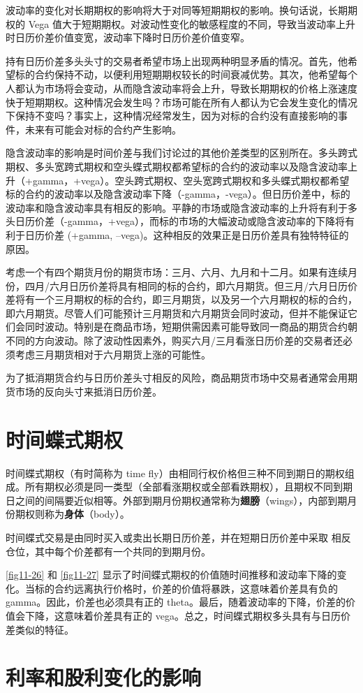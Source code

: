 波动率的变化对长期期权的影响将大于对同等短期期权的影响。换句话说，长期期权的 Vega 值大于短期期权。对波动性变化的敏感程度的不同，导致当波动率上升时日历价差价值变宽，波动率下降时日历价差价值变窄。

持有日历价差多头头寸的交易者希望市场上出现两种明显矛盾的情况。首先，他希望标的合约保持不动，以便利用短期期权较长的时间衰减优势。其次，他希望每个人都认为市场将会变动，从而隐含波动率将会上升，导致长期期权的价格上涨速度快于短期期权。这种情况会发生吗？市场可能在所有人都认为它会发生变化的情况下保持不变吗？事实上，这种情况经常发生，因为对标的合约没有直接影响的事件，未来有可能会对标的合约产生影响。

隐含波动率的影响是时间价差与我们讨论过的其他价差类型的区别所在。多头跨式期权、多头宽跨式期权和空头蝶式期权都希望标的合约的波动率以及隐含波动率上升（+gamma，+vega）。空头跨式期权、空头宽跨式期权和多头蝶式期权都希望标的合约的波动率以及隐含波动率下降（-gamma，-vega）。但日历价差中，标的波动率和隐含波动率具有相反的影响。平静的市场或隐含波动率的上升将有利于多头日历价差（-gamma，+vega），而标的市场的大幅波动或隐含波动率的下降将有利于日历价差 (+gamma, –vega)。这种相反的效果正是日历价差具有独特特征的原因。


考虑一个有四个期货月份的期货市场：三月、六月、九月和十二月。如果有连续月份，四月/六月日历价差将具有相同的标的合约，即六月期货。但三月/六月日历价差将有一个三月期权的标的合约，即三月期货，以及另一个六月期权的标的合约，即六月期货。尽管人们可能预计三月期货和六月期货会同时波动，但并不能保证它们会同时波动。特别是在商品市场，短期供需因素可能导致同一商品的期货合约朝不同的方向波动。除了波动性因素外，购买六月/三月看涨日历价差的交易者还必须考虑三月期货相对于六月期货上涨的可能性。

为了抵消期货合约与日历价差头寸相反的风险，商品期货市场中交易者通常会用期货市场的反向头寸来抵消日历价差。
\section{时间蝶式期权}
时间蝶式期权（有时简称为 time fly）由相同行权价格但三种不同到期日的期权组成。所有期权必须是同一类型（全部看涨期权或全部看跌期权），且期权不同到期日之间的间隔要近似相等。外部到期月份期权通常称为\textbf{翅膀}（wings），内部到期月份期权则称为\textbf{身体}（body）。

时间蝶式交易是由同时买入或卖出长期日历价差，并在短期日历价差中采取
相反仓位，其中每个价差都有一个共同的到期月份。


\autoref{fig11-26} 和 \autoref{fig11-27} 显示了时间蝶式期权的价值随时间推移和波动率下降的变化。当标的合约远离执行价格时，价差的价值将暴跌，这意味着价差具有负的 gamma。因此，价差也必须具有正的 theta。最后，随着波动率的下降，价差的价值会下降，这意味着价差具有正的 vega。总之，时间蝶式期权多头具有与日历价差类似的特征。
\section{利率和股利变化的影响}